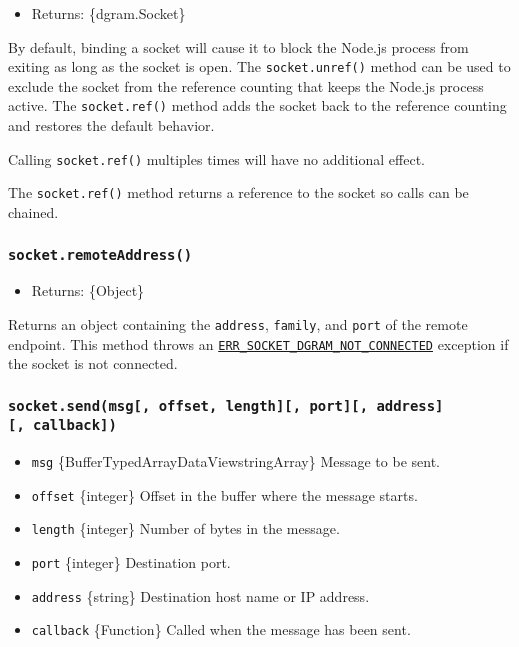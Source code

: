 \begin{itemize}
\tightlist
\item
  Returns: \{dgram.Socket\}
\end{itemize}

By default, binding a socket will cause it to block the Node.js process
from exiting as long as the socket is open. The \texttt{socket.unref()}
method can be used to exclude the socket from the reference counting
that keeps the Node.js process active. The \texttt{socket.ref()} method
adds the socket back to the reference counting and restores the default
behavior.

Calling \texttt{socket.ref()} multiples times will have no additional
effect.

The \texttt{socket.ref()} method returns a reference to the socket so
calls can be chained.

\subsubsection{\texorpdfstring{\texttt{socket.remoteAddress()}}{socket.remoteAddress()}}\label{socket.remoteaddress}

\begin{itemize}
\tightlist
\item
  Returns: \{Object\}
\end{itemize}

Returns an object containing the \texttt{address}, \texttt{family}, and
\texttt{port} of the remote endpoint. This method throws an
\href{errors.md\#err_socket_dgram_not_connected}{\texttt{ERR\_SOCKET\_DGRAM\_NOT\_CONNECTED}}
exception if the socket is not connected.

\subsubsection{\texorpdfstring{\texttt{socket.send(msg{[},\ offset,\ length{]}{[},\ port{]}{[},\ address{]}{[},\ callback{]})}}{socket.send(msg{[}, offset, length{]}{[}, port{]}{[}, address{]}{[}, callback{]})}}\label{socket.sendmsg-offset-length-port-address-callback}

\begin{itemize}
\tightlist
\item
  \texttt{msg}
  \{Buffer\textbar TypedArray\textbar DataView\textbar string\textbar Array\}
  Message to be sent.
\item
  \texttt{offset} \{integer\} Offset in the buffer where the message
  starts.
\item
  \texttt{length} \{integer\} Number of bytes in the message.
\item
  \texttt{port} \{integer\} Destination port.
\item
  \texttt{address} \{string\} Destination host name or IP address.
\item
  \texttt{callback} \{Function\} Called when the message has been sent.
\end{itemize}

